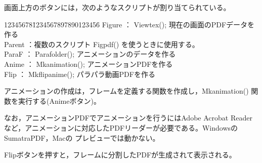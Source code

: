 \documentclass[papersize,a4paper,12pt,uplatex]{jsarticle}
\begin{document}
画面上方のボタンには，次のようなスクリプトが割り当てられている。

\begin{tabbing}
  12345678\=1234567897890123456\=\kill
  Figure  \>： Viewtex(); \>現在の画面のPDFデータを作る\\
  Parent   \>：複数のスクリプト    \>Figpdf() を使うときに使用する。\\
  ParaF \>： Parafolder(); \>アニメーションのデータを作る\\
  Anime  \>： Mkanimation(); \>アニメーションPDFを作る\\
  Flip   \>： Mkflipanime(); \>パラパラ動画PDFを作る
\end{tabbing}

アニメーションの作成は，フレームを定義する関数を作成し，Mkanimation() 関数を実行する(Animeボタン)。




なお，アニメーションPDFでアニメーションを行うにはAdobe Acrobat Reader など，アニメーションに対応したPDFリーダーが必要である。WindowsのSumatraPDF，Macの プレビューでは動かない。

Flipボタンを押すと，フレームに分割したPDFが生成されて表示される。
\end{document}
